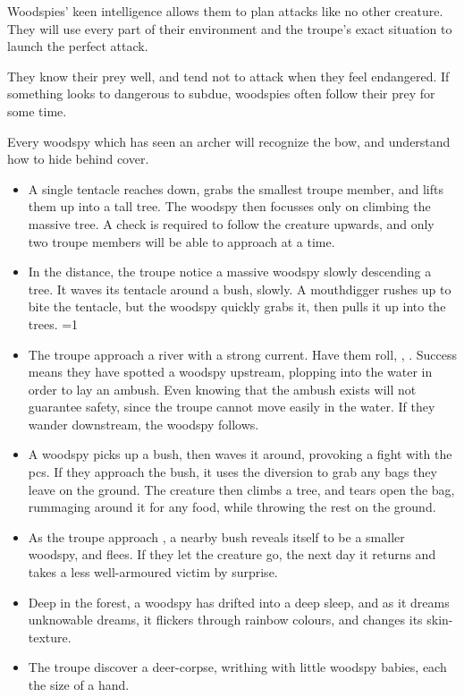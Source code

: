 \begin{multicols}{2}
\showEnc[E]

Woodspies' keen intelligence allows them to plan attacks like no other creature.
They will use every part of their environment and the troupe's exact situation to launch the perfect attack.

They know their prey well, and tend not to attack when they feel endangered.
If something looks to dangerous to subdue, woodspies often follow their prey for some time.

Every woodspy which has seen an archer will recognize the bow, and understand how to hide behind cover.

\begin{itemize}
  \item
  A single tentacle reaches down, grabs the smallest troupe member, and lifts them up into a tall tree.
  The woodspy then focusses only on climbing the massive tree.
  A  check is required to follow the creature upwards, and only two troupe members will be able to approach at a time.
  \item
  In the distance, the troupe notice a massive woodspy slowly descending a tree.
  It waves its tentacle around a bush, slowly.
  A mouthdigger rushes up to bite the tentacle, but the woodspy quickly grabs it, then pulls it up into the trees.
  \ifnum\value{temperature}=1
    \item
    The troupe approach a river with a strong current.
    Have them roll, , \tn[9].
    Success means they have spotted a woodspy upstream, plopping into the water in order to lay an ambush.
    Even knowing that the ambush exists will not guarantee safety, since the troupe cannot move easily in the water.
    If they wander downstream, the woodspy follows.
    \item
    A woodspy picks up a bush, then waves it around, provoking a fight with the \glspl{pc}.
    If they approach the bush, it uses the diversion to grab any bags they leave on the ground.
    The creature then climbs a tree, and tears open the bag, rummaging around it for any food, while throwing the rest on the ground.
  \else
    \item
    As the troupe approach , a nearby bush reveals itself to be a smaller woodspy, and flees.
    If they let the creature go, the next day it returns and takes a less well-armoured victim by surprise.
    \item
    Deep in the forest, a woodspy has drifted into a deep sleep, and as it dreams unknowable dreams, it flickers through rainbow colours, and changes its skin-texture.
    \item
    The troupe discover a deer-corpse, writhing with little woodspy babies, each the size of a hand.
  \fi
\end{itemize}

\end{multicols}

